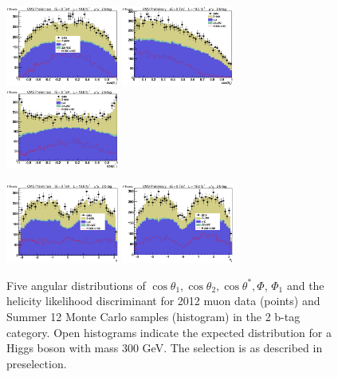 \begin{figure}[thb!]
\centerline{
\includegraphics[width=0.33\textwidth]{presentation/defense/images/preselection/2/mu/costheta1.eps}
\includegraphics[width=0.33\textwidth]{presentation/defense/images/preselection/2/mu/costheta2.eps}
\includegraphics[width=0.33\textwidth]{presentation/defense/images/preselection/2/mu/costhetast.eps}
}
\centerline{
\includegraphics[width=0.33\textwidth]{presentation/defense/images/preselection/2/mu/phi.eps}
\includegraphics[width=0.33\textwidth]{presentation/defense/images/preselection/2/mu/phi1.eps}
}
\caption{
Five angular distributions of $\cos\theta_1, \cos\theta_2, \cos\theta^*, \Phi$, $\Phi_1$ and the helicity likelihood discriminant for 2012 muon data (points) and Summer 12 Monte Carlo samples (histogram) in the 2 b-tag category.  Open histograms indicate the expected distribution for a Higgs boson with mass 300 GeV. The selection is as described in preselection.
\label{helicityDistDataMCM2}}
\end{figure}

